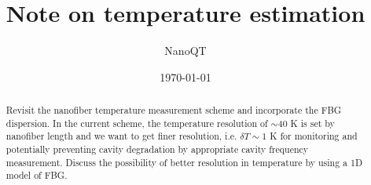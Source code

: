 \documentclass[aps,pra, onecolumn,superscriptaddress,nopacs,floatfix, showkeys, notitlepage]{revtex4-1}
\begin{document}
\title{Note on temperature estimation}
\author{NanoQT}
\date{\today}

\begin{abstract}
Revisit the nanofiber temperature measurement scheme and incorporate the FBG dispersion.
In the current scheme, the temperature resolution of $\sim 40$ K is set by nanofiber length and we want to get finer resolution, i.e. $\delta T\sim 1$ K for monitoring and potentially preventing cavity degradation by appropriate cavity frequency measurement. Discuss the possibility of better resolution in temperature by using a 1D model of FBG.
\end{abstract}


\maketitle
\end{document}
